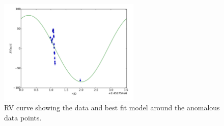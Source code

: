 \documentclass[11pt]{paper}
\begin{document}
\begin{figure}
\begin{center}
    \includegraphics[width=0.6\textwidth]{outputs/rverror.pdf}
    \caption{RV curve showing the data and best fit model around the anomalous data points.}
    \label{fig:err}
\end{center}
\end{figure}

\setlength\bibsep{0pt}


\end{document}
